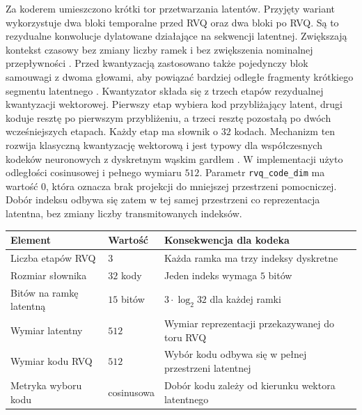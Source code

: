 Za koderem umieszczono krótki tor przetwarzania latentów. Przyjęty wariant wykorzystuje dwa bloki temporalne przed RVQ oraz dwa bloki po RVQ. Są to rezydualne konwolucje dylatowane działające na sekwencji latentnej. Zwiększają kontekst czasowy bez zmiany liczby ramek i bez zwiększenia nominalnej przepływności \cite{He2016DeepResidualLearning}. Przed kwantyzacją zastosowano także pojedynczy blok samouwagi z dwoma głowami, aby powiązać bardziej odległe fragmenty krótkiego segmentu latentnego \cite{Vaswani2017Attention}. Kwantyzator składa się z trzech etapów rezydualnej kwantyzacji wektorowej. Pierwszy etap wybiera kod przybliżający latent, drugi koduje resztę po pierwszym przybliżeniu, a trzeci resztę pozostałą po dwóch wcześniejszych etapach. Każdy etap ma słownik o \(32\) kodach. Mechanizm ten rozwija klasyczną kwantyzację wektorową i jest typowy dla współczesnych kodeków neuronowych z dyskretnym wąskim gardłem \cite{Gray1984VectorQuantization,VanDenOord2017NeuralDiscrete,Zeghidour2021SoundStream}. W implementacji użyto odległości cosinusowej i pełnego wymiaru \(512\). Parametr \texttt{rvq\_code\_dim} ma wartość \(0\), która oznacza brak projekcji do mniejszej przestrzeni pomocniczej. Dobór indeksu odbywa się zatem w tej samej przestrzeni co reprezentacja latentna, bez zmiany liczby transmitowanych indeksów.

\begin{center}
\centering
\small
\begin{tabular}{>{\raggedright\arraybackslash}p{} >{\raggedright\arraybackslash}p{} >{\raggedright\arraybackslash}p{}}
\toprule
Element & Wartość & Konsekwencja dla kodeka \\
\midrule
Liczba etapów RVQ & \(3\) & Każda ramka ma trzy indeksy dyskretne \\
Rozmiar słownika & \(32\) kody & Jeden indeks wymaga \(5\) bitów \\
Bitów na ramkę latentną & \(15\) bitów & \(3 \cdot \log_2 32\) dla każdej ramki \\
Wymiar latentny & \(512\) & Wymiar reprezentacji przekazywanej do toru RVQ \\
Wymiar kodu RVQ & \(512\) & Wybór kodu odbywa się w pełnej przestrzeni latentnej \\
Metryka wyboru kodu & cosinusowa & Dobór kodu zależy od kierunku wektora latentnego \\
\bottomrule
\end{tabular}
\label{tab:rvq-parametry-referencyjne}
\end{center}

